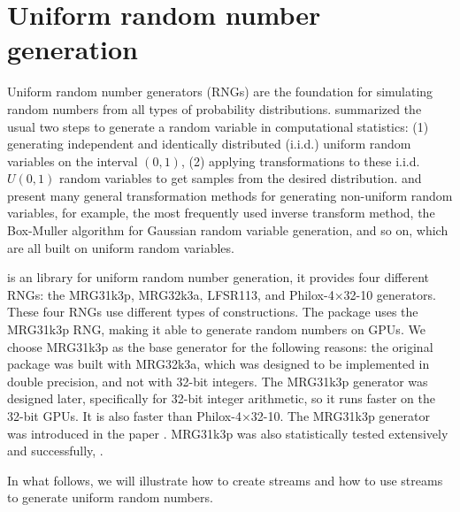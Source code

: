 \documentclass[article,nojss]{jss}\usepackage[]{graphicx}\usepackage[]{color}
\begin{document}
\section{Uniform random number generation} \label{}
Uniform random number generators (RNGs) are the foundation for simulating random numbers from all types of probability distributions. \cite{l2012random} summarized the usual two steps to generate a random variable in computational statistics: (1) generating independent and identically distributed (i.i.d.) uniform random variables on the interval $(0, 1)$, (2) applying transformations to these i.i.d. $U(0, 1)$ random variables to get samples from the desired distribution. \cite{l2012random} and \cite{robert2004random} present many general transformation methods for generating non-uniform random variables, for example, the most frequently used inverse transform method, the Box-Muller algorithm \citep{box1958note} for Gaussian random variable generation, and so on, which are all built on uniform random variables. %


 is an  library for uniform random number generation, it provides four different RNGs: the MRG31k3p, MRG32k3a, LFSR113, and Philox-4×32-10 generators. These four RNGs use different types of constructions. The  package uses the MRG31k3p RNG, making it able to generate random numbers on GPUs. We choose MRG31k3p as the base generator for the following reasons:  the original  package \citep{l2002object} was built with MRG32k3a, which was designed to be implemented in double precision, and not with 32-bit integers. The MRG31k3p generator was designed later, specifically for 32-bit integer arithmetic, so it runs faster on the 32-bit GPUs. It is also faster than Philox-4×32-10. The MRG31k3p generator was introduced in the paper \citep{rLEC00b}. MRG31k3p was also statistically tested extensively and successfully, \cite[see][]{rLEC07b}.    




In what follows, we will illustrate how to create streams and how to use streams to generate uniform random numbers. 

\end{document}
